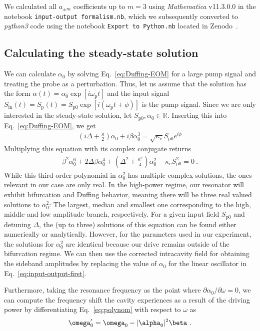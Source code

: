 We calculated all $a_{\pm m}$ coefficients up to $m=3$ using \textit{Mathematica} v11.3.0.0 in the notebook \texttt{input-output formalism.nb}, which we subsequently converted to \textit{python3} code using the notebook \texttt{Export to Python.nb} located in Zenodo~\cite{schmidtDataProcessingCurrent2020}.

\subsection{Calculating the steady-state solution}\label{sec:Duffing}
% 
We can calculate $\alpha_0$ by solving Eq.~\eqref{eq:Duffing-EOM} for a large pump signal and treating the probe as a perturbation.
% 
Thus, let us assume that the solution has the form $\alpha(t)=\alpha_0 \exp [i\omega_\text{p} t]$ and the input signal $S_\text{in}(t) = S_\text{p}(t) =S_\text{p0} \exp [i(\omega_\text{p} t+\phi)]$ is the pump signal.
% 
Since we are only interested in the steady-state solution, let $S_\text{p0},\alpha_0 \in \mathbb{R}$.
% 
Inserting this into Eq.~\eqref{eq:Duffing-EOM}, we get
% 
\begin{align}
\left(i\Delta+\frac{\kappa}{2}\right)\alpha_0 + i\beta\alpha_0^3=\sqrt{\kappa_\text{e}}S_\text{p0}e^{i\phi}
\end{align}
% 
Multiplying this equation with its complex conjugate returns
% 
\begin{align}
\beta^2 \alpha_0^6 + 2\Delta\beta\alpha_0^4 + \left(\Delta^2+\frac{\kappa^2}{4}\right)\alpha_0^2 - \kappa_\text{e} S_\text{p0}^2 = 0\ .
\label{eq:polynom}
\end{align}
% 
While this third-order polynomial in $\alpha_0^2$ has multiple complex solutions, the ones relevant in our case are only real.
% 
In the high-power regime, our resonator will exhibit bifurcation and Duffing behavior, meaning there will be three real valued solutions to $\alpha_0^2$:
% 
The largest, median and smallest one corresponding to the high, middle and low amplitude branch, respectively.
% 
For a given input field $S_\text{p0}$ and detuning $\Delta$, the (up to three) solutions of this equation can be found either numerically or analytically.
% 
However, for the parameters used in our experiment, the solutions for $\alpha_0^2$ are identical because our drive remains outside of the bifurcation regime.
% 
We can then use the corrected intracavity field for obtaining the sideband amplitudes by replacing the value of $\alpha_0$ for the linear oscillator in Eq.~\eqref{eq:input-output-first}.

Furthermore, taking the resonance frequency as the point where $\partial\alpha_0/\partial\omega=0$, we can compute the frequency shift the cavity experiences as a result of the driving power by differentiating Eq.~\eqref{eq:polynom} with respect to $\omega$ as
% 
\begin{align}
\omega_0' = \omega_0 - \abs{\alpha_0}^2\beta\ .
\label{eq:Duffing-shift}
\end{align}


